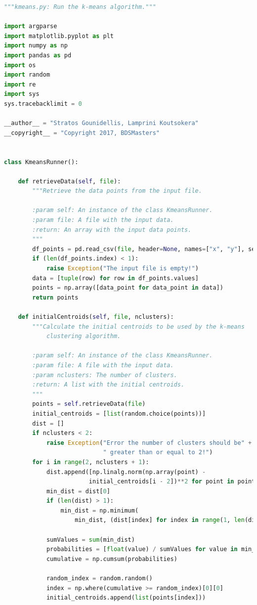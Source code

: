 \documentclass[11pt]{article}
\begin{document}
\begin{lstlisting}[language=Python]
"""kmeans.py: Run the k-means algorithm."""

import argparse
import matplotlib.pyplot as plt
import numpy as np
import pandas as pd
import os
import random
import re
import sys
sys.tracebacklimit = 0

__author__ = "Stratos Gounidellis, Lamprini Koutsokera"
__copyright__ = "Copyright 2017, BDSMasters"


class KmeansRunner():

    def retrieveData(self, file):
        """Retrieve the data points from the input file.

        :param self: An instance of the class KmeansRunner.
        :param file: A file with the input data.
        :return: An array with the input data points.
        """
        df_points = pd.read_csv(file, header=None, names=["x", "y"], sep=" ")
        if (len(df_points.index) < 1):
            raise Exception("The input file is empty!")
        data = [tuple(row) for row in df_points.values]
        points = np.array([data_point for data_point in data])
        return points

    def initialCentroids(self, file, nclusters):
        """Calculate the initial centroids to be used by the k-means
            clustering algorithm.

        :param self: An instance of the class KmeansRunner.
        :param file: A file with the input data.
        :param nclusters: The number of clusters.
        :return: A list with the initial centroids.
        """
        points = self.retrieveData(file)
        initial_centroids = [list(random.choice(points))]
        dist = []
        if nclusters < 2:
            raise Exception("Error the number of clusters should be" +
                            " greater than or equal to 2!")
        for i in range(2, nclusters + 1):
            dist.append([np.linalg.norm(np.array(point) -
                        initial_centroids[i - 2])**2 for point in points])
            min_dist = dist[0]
            if (len(dist) > 1):
                min_dist = np.minimum(
                    min_dist, (dist[index] for index in range(1, len(dist))))

            sumValues = sum(min_dist)
            probabilities = [float(value) / sumValues for value in min_dist]
            cumulative = np.cumsum(probabilities)

            random_index = random.random()
            index = np.where(cumulative >= random_index)[0][0]
            initial_centroids.append(list(points[index]))


\end{lstlisting}
\end{document}
